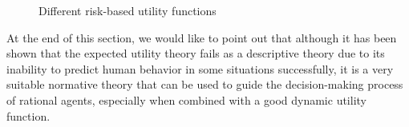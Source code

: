 \begin{figure}[H]
\begin{minipage}{.3\textwidth}
    \end{minipage}
    \hspace{1em}
    \begin{minipage}{.3\textwidth}
      \centering
    \end{minipage}
    \caption{Different risk-based utility functions}
    \label{fig:risk-based-utility}
\end{figure}

At the end of this section, we would like to point out that although it has been shown \cite{kahneman2013prospect} that the expected utility theory fails as a descriptive theory due to its inability to predict human behavior in some situations successfully, it is a very suitable normative theory that can be used to guide the decision-making process of rational agents, especially when combined with a good dynamic utility function.

